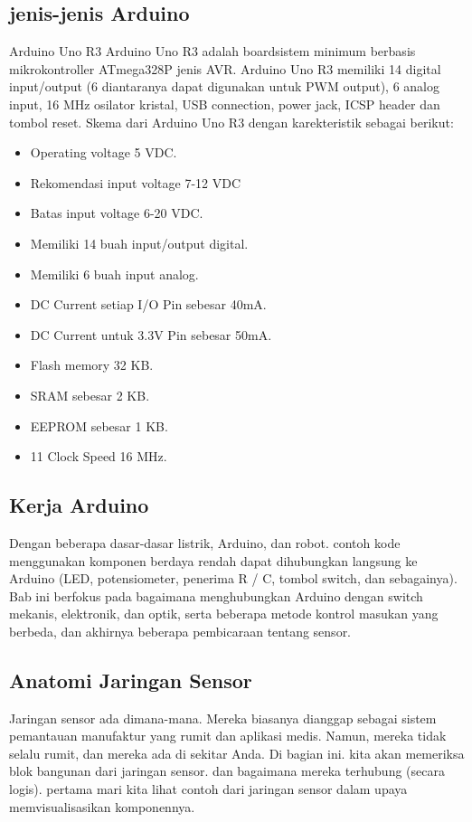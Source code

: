 \subsection{jenis-jenis Arduino}
Arduino Uno R3
Arduino Uno R3 adalah boardsistem minimum berbasis mikrokontroller ATmega328P jenis AVR. Arduino Uno R3 memiliki 14 digital input/output (6
diantaranya dapat digunakan untuk PWM output), 6 analog input, 16 MHz osilator kristal, USB connection, power jack, ICSP header dan tombol reset. Skema dari Arduino Uno R3 dengan
karekteristik sebagai berikut:
\begin{itemize}
\item Operating voltage 5 VDC.

\item Rekomendasi input voltage 7-12
VDC
\item Batas input voltage 6-20 VDC.
\item Memiliki 14 buah input/output digital.
\item Memiliki 6 buah input analog.
\item DC Current setiap I/O Pin sebesar 40mA.
\item DC Current untuk 3.3V Pin sebesar 50mA.
\item Flash memory 32 KB.
\item SRAM sebesar 2 KB.
\item EEPROM sebesar 1 KB.
\item 11 Clock Speed 16 MHz.
\end{itemize}

\subsection{Kerja Arduino}
Dengan beberapa dasar-dasar listrik, Arduino, dan robot.
contoh kode menggunakan komponen berdaya rendah dapat dihubungkan langsung ke Arduino (LED, potensiometer, penerima R / C, tombol switch, dan sebagainya). 
Bab ini berfokus pada bagaimana menghubungkan Arduino dengan switch mekanis, elektronik, dan optik, serta beberapa metode kontrol masukan yang berbeda, dan akhirnya beberapa pembicaraan tentang sensor.

\subsection{Anatomi Jaringan Sensor}
Jaringan sensor ada dimana-mana. Mereka biasanya dianggap sebagai sistem pemantauan manufaktur yang rumit
dan aplikasi medis. Namun, mereka tidak selalu rumit, dan mereka ada di sekitar Anda.
Di bagian ini. kita akan memeriksa blok bangunan dari jaringan sensor. dan bagaimana mereka terhubung (secara logis).
pertama mari kita lihat contoh dari jaringan sensor dalam upaya memvisualisasikan komponennya.

